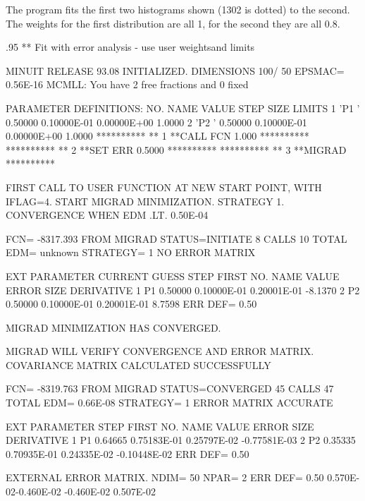 The program fits the first two histograms shown (1302 is dotted)
to the second.  The weights for the first distribution are all 1,
for the second they are all 0.8.
\begin{Listing}
{\scriptsize\baselineskip.95\baselineskip\relax
 ** Fit with error analysis - use user weightsand limits
 
  MINUIT RELEASE 93.08  INITIALIZED.   DIMENSIONS 100/ 50  EPSMAC=  0.56E-16
 MCMLL: You have  2 free fractions and  0 fixed
 
 PARAMETER DEFINITIONS:
    NO.   NAME         VALUE      STEP SIZE      LIMITS
     1 'P1        '   0.50000      0.10000E-01    0.00000E+00   1.0000
     2 'P2        '   0.50000      0.10000E-01    0.00000E+00   1.0000
 **********
 **    1 **CALL FCN   1.000
 **********
 **********
 **    2 **SET ERR  0.5000
 **********
 **********
 **    3 **MIGRAD
 **********
 
 FIRST CALL TO USER FUNCTION AT NEW START POINT, WITH IFLAG=4.
 START MIGRAD MINIMIZATION.  STRATEGY 1.  CONVERGENCE WHEN EDM .LT. 0.50E-04
 
 FCN=  -8317.393     FROM MIGRAD    STATUS=INITIATE       8 CALLS       10 TOTAL
                     EDM= unknown      STRATEGY= 1      NO ERROR MATRIX
 
  EXT PARAMETER               CURRENT GUESS       STEP         FIRST
  NO.   NAME        VALUE          ERROR          SIZE      DERIVATIVE
   1      P1       0.50000       0.10000E-01   0.20001E-01   -8.1370
   2      P2       0.50000       0.10000E-01   0.20001E-01    8.7598
                               ERR DEF=  0.50
 
 MIGRAD MINIMIZATION HAS CONVERGED.
 
 MIGRAD WILL VERIFY CONVERGENCE AND ERROR MATRIX.
 COVARIANCE MATRIX CALCULATED SUCCESSFULLY
 
 FCN=  -8319.763     FROM MIGRAD    STATUS=CONVERGED     45 CALLS       47 TOTAL
                     EDM=  0.66E-08    STRATEGY= 1      ERROR MATRIX ACCURATE
 
  EXT PARAMETER                                   STEP         FIRST
  NO.   NAME        VALUE          ERROR          SIZE      DERIVATIVE
   1      P1       0.64665       0.75183E-01   0.25797E-02  -0.77581E-03
   2      P2       0.35335       0.70935E-01   0.24335E-02  -0.10448E-02
                               ERR DEF=  0.50
 
 EXTERNAL ERROR MATRIX.    NDIM=  50    NPAR=  2    ERR DEF=  0.50
  0.570E-02-0.460E-02
 -0.460E-02 0.507E-02
 
}
\end{Listing}
